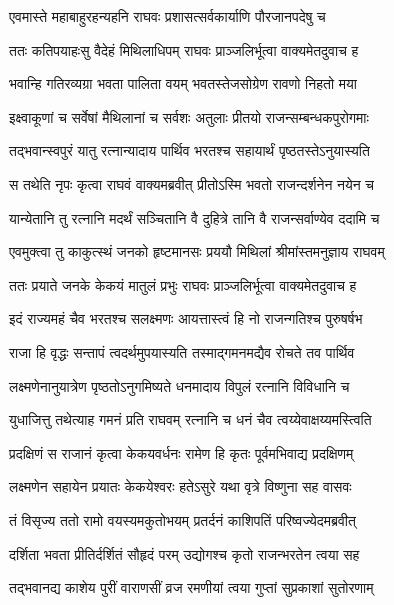 
\twolineshloka
{एवमास्ते महाबाहुरहन्यहनि राघवः}
{प्रशासत्सर्वकार्याणि पौरजानपदेषु च} %

\twolineshloka
{ततः कतिपयाहःसु वैदेहं मिथिलाधिपम्}
{राघवः प्राञ्जलिर्भूत्वा वाक्यमेतदुवाच ह} %

\twolineshloka
{भवान्हि गतिरव्यग्रा भवता पालिता वयम्}
{भवतस्तेजसोग्रेण रावणो निहतो मया} %

\twolineshloka
{इक्ष्वाकूणां च सर्वेषां मैथिलानां च सर्वशः}
{अतुलाः प्रीतयो राजन्सम्बन्धकपुरोगमाः} %

\twolineshloka
{तद्भवान्स्वपुरं यातु रत्नान्यादाय पार्थिव}
{भरतश्च सहायार्थं पृष्ठतस्तेऽनुयास्यति} %

\twolineshloka
{स तथेति नृपः कृत्वा राघवं वाक्यमब्रवीत्}
{प्रीतोऽस्मि भवतो राजन्दर्शनेन नयेन च} %

\twolineshloka
{यान्येतानि तु रत्नानि मदर्थं सञ्चितानि वै}
{दुहित्रे तानि वै राजन्सर्वाण्येव ददामि च} %

\twolineshloka
{एवमुक्त्वा तु काकुत्स्थं जनको हृष्टमानसः}
{प्रययौ मिथिलां श्रीमांस्तमनुज्ञाय राघवम्} %

\twolineshloka
{ततः प्रयाते जनके केकयं मातुलं प्रभुः}
{राघवः प्राञ्जलिर्भूत्वा वाक्यमेतदुवाच ह} %

\twolineshloka
{इदं राज्यमहं चैव भरतश्च सलक्ष्मणः}
{आयत्तास्त्वं हि नो राजन्गतिश्च पुरुषर्षभ} %

\twolineshloka
{राजा हि वृद्धः सन्तापं त्वदर्थमुपयास्यति}
{तस्माद्गमनमद्यैव रोचते तव पार्थिव} %

\twolineshloka
{लक्ष्मणेनानुयात्रेण पृष्ठतोऽनुगमिष्यते}
{धनमादाय विपुलं रत्नानि विविधानि च} %

\twolineshloka
{युधाजित्तु तथेत्याह गमनं प्रति राघवम्}
{रत्नानि च धनं चैव त्वय्येवाक्षय्यमस्त्विति} %

\twolineshloka
{प्रदक्षिणं स राजानं कृत्वा केकयवर्धनः}
{रामेण हि कृतः पूर्वमभिवाद्य प्रदक्षिणम्} %

\twolineshloka
{लक्ष्मणेन सहायेन प्रयातः केकयेश्वरः}
{हतेऽसुरे यथा वृत्रे विष्णुना सह वासवः} %

\twolineshloka
{तं विसृज्य ततो रामो वयस्यमकुतोभयम्}
{प्रतर्दनं काशिपतिं परिष्वज्येदमब्रवीत्} %

\twolineshloka
{दर्शिता भवता प्रीतिर्दर्शितं सौहृदं परम्}
{उद्योगश्च कृतो राजन्भरतेन त्वया सह} %

\twolineshloka
{तद्भवानद्य काशेय पुरीं वाराणसीं व्रज}
{रमणीयां त्वया गुप्तां सुप्रकाशां सुतोरणाम्} %

